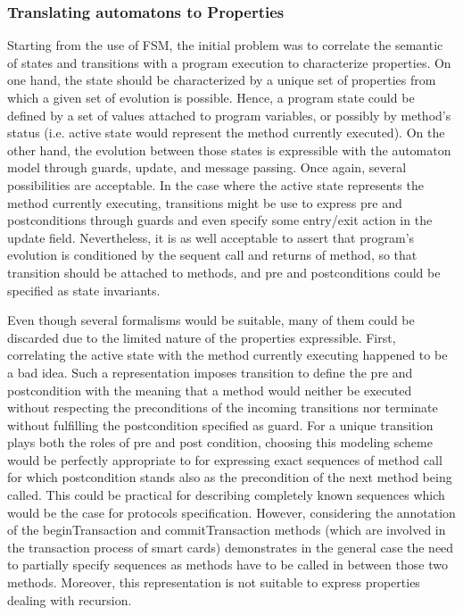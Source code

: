 \subsubsection{Translating automatons to Properties}
Starting from the use of FSM, the initial problem was to correlate the semantic of states and transitions with a program execution to characterize properties. On one hand, the state should be characterized by a unique set of properties from which a given set of evolution is possible. Hence, a program state could be defined by a set of values attached to program variables, or possibly by method's status (i.e. active state would represent the method currently executed). On the other hand, the evolution between those states is expressible with the automaton model through guards, update, and message passing. Once again, several possibilities are acceptable. In the case where the active state represents the method currently executing, transitions might be use to express pre and postconditions through guards and even specify some entry/exit action in the update field. Nevertheless, it is as well acceptable to assert that program's evolution is conditioned by the sequent call and returns of method, so that transition should be attached to methods, and pre and postconditions could be specified as state invariants.

Even though several formalisms would be suitable, many of them could be discarded due to the limited nature of the properties expressible. First, correlating the active state with the method currently executing happened to be a bad idea. Such a representation imposes transition to define the pre and postcondition with the meaning that a method would neither be executed without respecting the preconditions of the incoming transitions nor terminate without fulfilling the postcondition specified as guard. For a unique transition plays both the roles of pre and post condition, choosing this modeling scheme would be perfectly appropriate to for expressing exact sequences of method call for which postcondition stands also as the precondition of the next method being called. This could be practical for describing completely known sequences which would be the case for protocols specification. However, considering the annotation of the beginTransaction and commitTransaction methods (which are involved in the transaction process of smart cards) demonstrates in the general case the need to partially specify sequences as methods have to be called in between those two methods. Moreover, this representation is not suitable to express properties dealing with recursion.

